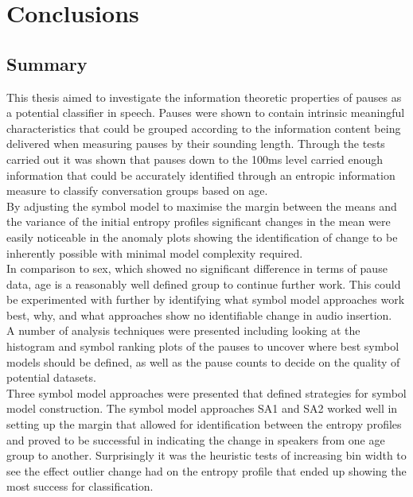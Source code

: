 \chapter{Conclusions}

\section{Summary}
This thesis aimed to investigate the information theoretic properties of pauses as a potential classifier in speech. Pauses were shown to contain intrinsic meaningful characteristics that could be grouped according to the information content being delivered when measuring pauses by their sounding length. Through the tests carried out it was shown that pauses down to the 100ms level carried enough information that could be accurately identified through an entropic information measure to classify conversation groups based on age. \\

By adjusting the symbol model to maximise the margin between the means and the variance of the initial entropy profiles significant changes in the mean were easily noticeable in the anomaly plots showing the identification of change to be inherently possible with minimal model complexity required. \\

In comparison to sex, which showed no significant difference in terms of pause data, age is a reasonably well defined group to continue further work. This could be experimented with further by identifying what symbol model approaches work best, why, and what approaches show no identifiable change in audio insertion. \\

A number of analysis techniques were presented including looking at the histogram and symbol ranking plots of the pauses to uncover where best symbol models should be defined, as well as the pause counts to decide on the quality of potential datasets. \\

Three symbol model approaches were presented that defined strategies for symbol model construction. The symbol model approaches SA1 and SA2 worked well in setting up the margin that allowed for identification between the entropy profiles and proved to be successful in indicating the change in speakers from one age group to another. Surprisingly it was the heuristic tests of increasing bin width to see the effect outlier change had on the entropy profile that ended up showing the most success for classification. \\


